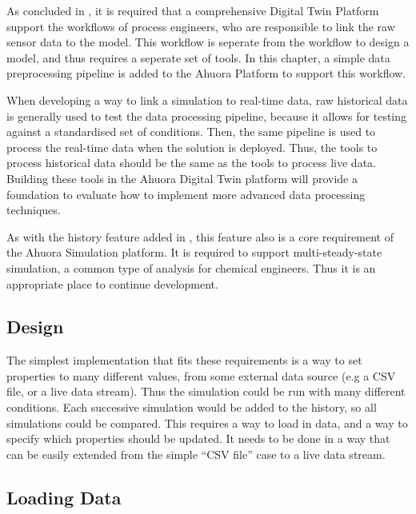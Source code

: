
As concluded in , it is required that a comprehensive Digital Twin Platform support the workflows of process engineers, who are responsible to link the raw sensor data to the model. This workflow is seperate from the workflow to design a model, and thus requires a seperate set of tools. 
In this chapter, a simple data preprocessing pipeline is added to the Ahuora Platform to support this workflow. 

When developing a way to link a simulation to real-time data, raw historical data is generally used to test the data processing pipeline, because it allows for testing against a standardised set of conditions. Then, the same pipeline is used to process the real-time data when the solution is deployed.
Thus, the tools to process historical data should be the same as the tools to process live data. 
Building these tools in the Ahuora Digital Twin platform will provide a foundation to evaluate how to implement more advanced data processing techniques.

As with the history feature added in , this feature also is a core requirement of the Ahuora Simulation platform. It is required to support multi-steady-state simulation, a common type of analysis for chemical engineers. Thus it is an appropriate place to continue development. 

\subsection{Design}



The simplest implementation that fits these requirements is a way to set properties to many different values, from some external data source (e.g a CSV file, or a live data stream). Thus the simulation could be run with many different conditions. Each successive simulation would be added to the history, so all simulations could be compared.
This requires a way to load in data, and a way to specify which properties should be updated. It needs to be done in a way that can be easily extended from the simple ``CSV file'' case to a live data stream.

\subsection{Loading Data}

